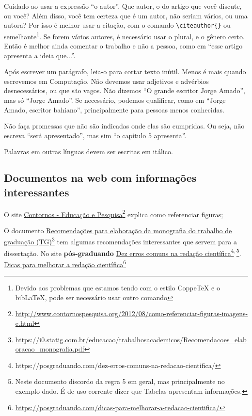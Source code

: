 \documentclass{article}
\begin{document}
\begin{itemize}
Cuidado ao usar a expressão ``o autor''. Que autor, o do artigo que você discute, ou você? Além disso, você tem certeza que é um autor, não seriam vários, ou uma autora? Por isso é melhor usar a citação, com o comando \verb!\citeauthor{}! ou semelhante\footnote{Devido aos problemas que estamos tendo com o estilo CoppeTeX e o bib\LaTeX, pode ser necessário usar outro comando}. Se forem vários autores, é necessário usar o plural, e o gênero certo. Então é melhor ainda comentar o trabalho e não a pessoa, como em ``esse artigo apresenta a ideia que...''.

Após escrever um parágrafo, leia-o para cortar texto inútil. Menos é mais quando escrevemos em Computação. Não devemos usar adjetivos e advérbios desnecessários, ou que são vagos. Não dizemos ``O grande escritor Jorge Amado'', mas só ``Jorge Amado''. Se necessário, podemos qualificar, como em ``Jorge Amado, escritor bahiano'', principalmente para pessoas menos conhecidas.

 Não faça promessas que não são indicadas onde elas são cumpridas. Ou seja, não escreva ``será apresentado'', mas sim ``o capítulo 5 apresenta''.

Palavras em outras línguas devem ser escritas em itálico.


\subsection{Documentos na web com informações interessantes}

\begin{outline}
\1 O site \href{http://www.contornospesquisa.org/2012/08/como-referenciar-figuras-imagens-e.html}{Contornos - Educação e Pesquisa}\footnote{\url{http://www.contornospesquisa.org/2012/08/como-referenciar-figuras-imagens-e.html}} explica como referenciar figuras;

\1 O documento \href{https://i0.statig.com.br/educacao/trabalhosacademicos/Recomendacoes_elaboracao_monografia.pdf}{Recomendações para elaboração da monografia do trabalho de graduação (TG)}\footnote{\url{https://i0.statig.com.br/educacao/trabalhosacademicos/Recomendacoes_elaboracao_monografia.pdf}} tem algumas recomendações interessantes que servem para a dissertação.
\1 No site \textbf{pós-graduando}
\2 \href{https://posgraduando.com/dez-erros-comuns-na-redacao-cientifica/}{Dez erros comuns na redação científica}\footnote{https://posgraduando.com/dez-erros-comuns-na-redacao-cientifica/}\textsuperscript{,\,}\footnote{Neste documento discordo da regra 5 em geral, mas principalmente no exemplo dado. É de uso corrente dizer que Tabelas apresentam informações.}. 
\2 \href{https://posgraduando.com/dicas-para-melhorar-a-redacao-cientifica/}{Dicas para melhorar a redação científica}\footnote{\url{https://posgraduando.com/dicas-para-melhorar-a-redacao-cientifica/}}
\end{outline}


\end{itemize}
\end{document}

